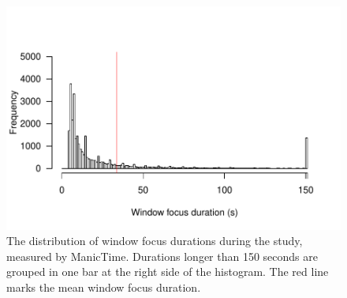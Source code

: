 \begin{figure}
\centering
\centerline{\includegraphics[scale=0.8]{images/ch56/ch56-7_WindowSwitches.pdf}}
\caption[Study 7 distribution of window focus durations]{The distribution of window focus durations during the study, measured by ManicTime. Durations longer than 150 seconds are grouped in one bar at the right side of the histogram. The red line marks the mean window focus duration.}
\label{fig:ch56-7_histswitches}
\end{figure}


